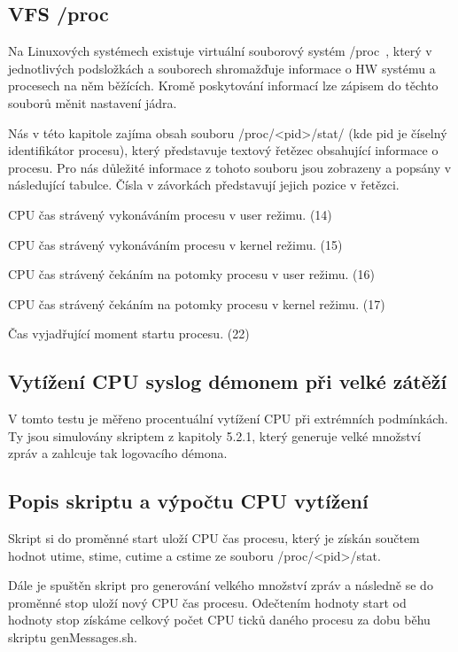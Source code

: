 \documentclass[thesis=B,czech]{FITthesis}[2012/06/26]
\begin{document}
\subsection{VFS /proc}
Na Linuxových systémech existuje virtuální souborový systém /proc~\cite{procFilesystem}, který v jednotlivých podsložkách a souborech shromažďuje informace o HW systému a procesech na něm běžících. Kromě poskytování informací lze zápisem do těchto souborů měnit nastavení jádra.

Nás v této kapitole zajíma obsah souboru /proc/<pid>/stat/ (kde pid je číselný identifikátor procesu), který představuje textový řetězec obsahující informace o procesu. Pro nás důležité informace z tohoto souboru jsou zobrazeny a popsány v následující tabulce. Čísla v závorkách představují jejich pozice v řetězci.

\begin{description}
\setlength\itemsep{-1ex}
	\item [utime:] CPU čas strávený vykonáváním procesu v user režimu. (14)
	\item [stime:] CPU čas strávený vykonáváním procesu v kernel režimu. (15)
	\item [cutime:] CPU čas strávený čekáním na potomky procesu v user režimu. (16)
	\item [cstime:] CPU čas strávený čekáním na potomky procesu v kernel režimu. (17)
	\item [starttime:] Čas vyjadřující moment startu procesu. (22)
\end{description}

\subsection{Vytížení CPU syslog démonem při velké zátěží}
V tomto testu je měřeno procentuální vytížení CPU při extrémních podmínkách. Ty jsou simulovány skriptem z kapitoly 5.2.1, který generuje velké množství zpráv a zahlcuje tak logovacího démona. 

\subsection*{Popis skriptu a výpočtu CPU vytížení}
Skript si do proměnné start uloží CPU čas procesu, který je získán součtem hodnot utime, stime, cutime a cstime ze souboru /proc/<pid>/stat.

Dále je spuštěn skript pro generování velkého množství zpráv a následně se do proměnné stop uloží nový CPU čas procesu. Odečtením hodnoty start od hodnoty stop získáme celkový počet CPU ticků daného procesu za dobu běhu skriptu genMessages.sh.
\end{document}
